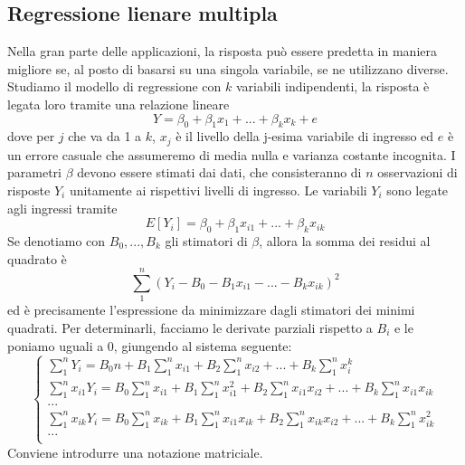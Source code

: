 \documentclass[11pt]{article}
\begin{document}
\subsection{Regressione lienare multipla}
Nella gran parte delle applicazioni, la risposta può essere predetta in maniera migliore se, al posto di basarsi su una singola variabile, se ne utilizzano diverse. Studiamo il modello di regressione con $k$ variabili indipendenti, la risposta è legata loro tramite una relazione lineare
\begin{displaymath}
    Y=\beta_0+\beta_1 x_1 + ... + \beta_k x_k + e
\end{displaymath}
dove per $j$ che va da 1 a $k$, $x_j$ è il livello della j-esima variabile di ingresso ed $e$ è un errore casuale che assumeremo di media nulla e varianza costante incognita. I parametri $\beta$ devono essere stimati dai dati, che consisteranno di $n$ osservazioni di risposte $Y_i$ unitamente ai rispettivi livelli di ingresso. Le variabili $Y_i$ sono legate agli ingressi tramite
\begin{displaymath}
    E[Y_i] = \beta_0 + \beta_1 x_{i1} + ... + \beta_k x_{ik}
\end{displaymath}
Se denotiamo con $B_0,...,B_k$ gli stimatori di $\beta$, allora la somma dei residui al quadrato è 
\begin{displaymath}
    \sum_1^n (Y_i-B_0- B_1x_{i1}-...-B_kx_{ik})^2
\end{displaymath}
ed è precisamente l'espressione da minimizzare dagli stimatori dei minimi quadrati. Per determinarli, facciamo le derivate parziali rispetto a $B_i$ e le poniamo uguali a 0, giungendo al sistema seguente:
\begin{displaymath}
    \begin{cases}
        \sum_1^n Y_i = B_0n+B_1\sum_1^n x_{i1} + B_2\sum_1^n x_{i2}+...+B_k\sum_1^n x_i^k\\ 
        \sum_1^n x_{i1}Y_i = B_0\sum_1^n x_{i1}+B_1\sum_1^n x_{i1}^2 + B_2\sum_1^n x_{i1}x_{i2}+...+B_k\sum_1^n x_{i1}x_{ik}\\ 
        ...\\
        \sum_1^n x_{ik}Y_i = B_0\sum_1^n x_{ik}+B_1\sum_1^n x_{i1}x_{ik} + B_2\sum_1^n x_{ik}x_{i2}+...+B_k\sum_1^n x_{ik}^2\\ 
    ...\\    \end{cases}
\end{displaymath}
Conviene introdurre una notazione matriciale.
\end{document}
